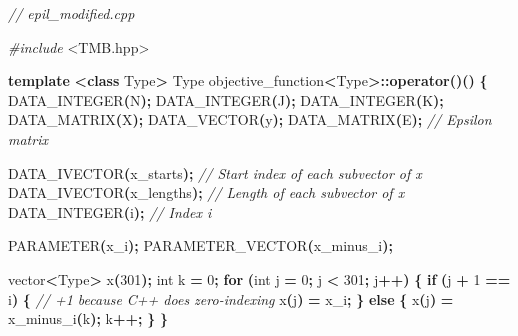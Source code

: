 \documentclass[a4paper, nobind]{templates/ociamthesis}
\newenvironment{Shaded}{\begin{snugshade}}{\end{snugshade}}
\newcommand{\CommentTok}[1]{\textcolor[rgb]{0.56,0.35,0.01}{\textit{#1}}}
\newcommand{\ControlFlowTok}[1]{\textcolor[rgb]{0.13,0.29,0.53}{\textbf{#1}}}
\newcommand{\DataTypeTok}[1]{\textcolor[rgb]{0.13,0.29,0.53}{#1}}
\newcommand{\DecValTok}[1]{\textcolor[rgb]{0.00,0.00,0.81}{#1}}
\newcommand{\ImportTok}[1]{#1}
\newcommand{\KeywordTok}[1]{\textcolor[rgb]{0.13,0.29,0.53}{\textbf{#1}}}
\newcommand{\NormalTok}[1]{#1}
\newcommand{\OperatorTok}[1]{\textcolor[rgb]{0.81,0.36,0.00}{\textbf{#1}}}
\newcommand{\PreprocessorTok}[1]{\textcolor[rgb]{0.56,0.35,0.01}{\textit{#1}}}
\renewenvironment{Shaded}
{
  \vspace{10pt}%
  \begin{snugshade}%
}{%
  \end{snugshade}%
  \vspace{8pt}%
}
\begin{document}
\begin{Shaded}
\begin{Highlighting}[]
\CommentTok{// epil\_modified.cpp}

\PreprocessorTok{\#include }\ImportTok{\textless{}TMB.hpp\textgreater{}}

\KeywordTok{template} \OperatorTok{\textless{}}\KeywordTok{class}\NormalTok{ Type}\OperatorTok{\textgreater{}}
\NormalTok{Type objective\_function}\OperatorTok{\textless{}}\NormalTok{Type}\OperatorTok{\textgreater{}::}\KeywordTok{operator}\OperatorTok{()()}
\OperatorTok{\{}
\NormalTok{  DATA\_INTEGER}\OperatorTok{(}\NormalTok{N}\OperatorTok{);}
\NormalTok{  DATA\_INTEGER}\OperatorTok{(}\NormalTok{J}\OperatorTok{);}
\NormalTok{  DATA\_INTEGER}\OperatorTok{(}\NormalTok{K}\OperatorTok{);}
\NormalTok{  DATA\_MATRIX}\OperatorTok{(}\NormalTok{X}\OperatorTok{);}
\NormalTok{  DATA\_VECTOR}\OperatorTok{(}\NormalTok{y}\OperatorTok{);}
\NormalTok{  DATA\_MATRIX}\OperatorTok{(}\NormalTok{E}\OperatorTok{);} \CommentTok{// Epsilon matrix}
  
\NormalTok{  DATA\_IVECTOR}\OperatorTok{(}\NormalTok{x\_starts}\OperatorTok{);}  \CommentTok{// Start index of each subvector of x}
\NormalTok{  DATA\_IVECTOR}\OperatorTok{(}\NormalTok{x\_lengths}\OperatorTok{);} \CommentTok{// Length of each subvector of x}
\NormalTok{  DATA\_INTEGER}\OperatorTok{(}\NormalTok{i}\OperatorTok{);}         \CommentTok{// Index i}
  
\NormalTok{  PARAMETER}\OperatorTok{(}\NormalTok{x\_i}\OperatorTok{);}
\NormalTok{  PARAMETER\_VECTOR}\OperatorTok{(}\NormalTok{x\_minus\_i}\OperatorTok{);}
  
\NormalTok{  vector}\OperatorTok{\textless{}}\NormalTok{Type}\OperatorTok{\textgreater{}}\NormalTok{ x}\OperatorTok{(}\DecValTok{301}\OperatorTok{);}
  \DataTypeTok{int}\NormalTok{ k }\OperatorTok{=} \DecValTok{0}\OperatorTok{;}
  \ControlFlowTok{for} \OperatorTok{(}\DataTypeTok{int}\NormalTok{ j }\OperatorTok{=} \DecValTok{0}\OperatorTok{;}\NormalTok{ j }\OperatorTok{\textless{}} \DecValTok{301}\OperatorTok{;}\NormalTok{ j}\OperatorTok{++)} \OperatorTok{\{}
    \ControlFlowTok{if} \OperatorTok{(}\NormalTok{j }\OperatorTok{+} \DecValTok{1} \OperatorTok{==}\NormalTok{ i}\OperatorTok{)} \OperatorTok{\{} \CommentTok{// +1 because C++ does zero{-}indexing}
\NormalTok{      x}\OperatorTok{(}\NormalTok{j}\OperatorTok{)} \OperatorTok{=}\NormalTok{ x\_i}\OperatorTok{;}
    \OperatorTok{\}} \ControlFlowTok{else} \OperatorTok{\{}
\NormalTok{      x}\OperatorTok{(}\NormalTok{j}\OperatorTok{)} \OperatorTok{=}\NormalTok{ x\_minus\_i}\OperatorTok{(}\NormalTok{k}\OperatorTok{);}
\NormalTok{      k}\OperatorTok{++;}
    \OperatorTok{\}}
  \OperatorTok{\}}
  

\end{Highlighting}
\end{Shaded}
\end{document}
